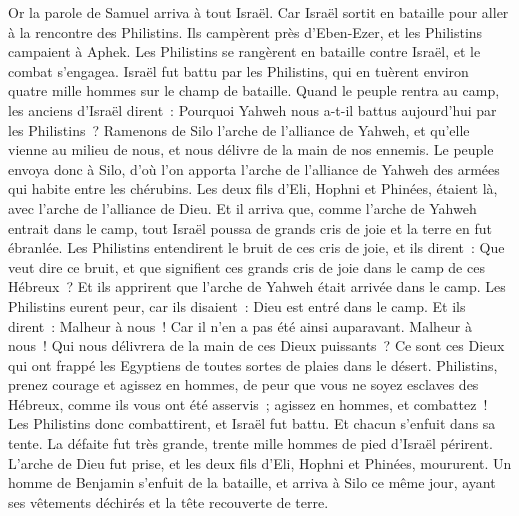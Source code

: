 \begin{multicols}{2}
\VerseOne{}Or la parole de Samuel arriva à tout Israël. Car Israël sortit en bataille pour aller à la rencontre des Philistins. Ils campèrent près d'Eben-Ezer, et les Philistins campaient à Aphek.
Les Philistins se rangèrent en bataille contre Israël, et le combat s'engagea. Israël fut battu par les Philistins, qui en tuèrent environ quatre mille hommes sur le champ de bataille.
Quand le peuple rentra au camp, les anciens d'Israël dirent~: Pourquoi Yahweh nous a-t-il battus aujourd'hui par les Philistins~? Ramenons de Silo l'arche de l'alliance de Yahweh, et qu'elle vienne au milieu de nous, et nous délivre de la main de nos ennemis.
Le peuple envoya donc à Silo, d'où l'on apporta l'arche de l'alliance de Yahweh des armées qui habite entre les chérubins. Les deux fils d'Eli, Hophni et Phinées, étaient là, avec l'arche de l'alliance de Dieu.
Et il arriva que, comme l'arche de Yahweh entrait dans le camp, tout Israël poussa de grands cris de joie et la terre en fut ébranlée.
Les Philistins entendirent le bruit de ces cris de joie, et ils dirent~: Que veut dire ce bruit, et que signifient ces grands cris de joie dans le camp de ces Hébreux~? Et ils apprirent que l'arche de Yahweh était arrivée dans le camp.
Les Philistins eurent peur, car ils disaient~: Dieu est entré dans le camp. Et ils dirent~: Malheur à nous~! Car il n'en a pas été ainsi auparavant.
Malheur à nous~! Qui nous délivrera de la main de ces Dieux puissants~? Ce sont ces Dieux qui ont frappé les Egyptiens de toutes sortes de plaies dans le désert.
Philistins, prenez courage et agissez en hommes, de peur que vous ne soyez esclaves des Hébreux, comme ils vous ont été asservis~; agissez en hommes, et combattez~!
Les Philistins donc combattirent, et Israël fut battu. Et chacun s'enfuit dans sa tente. La défaite fut très grande, trente mille hommes de pied d'Israël périrent.
L'arche de Dieu fut prise, et les deux fils d'Eli, Hophni et Phinées, moururent.
Un homme de Benjamin s'enfuit de la bataille, et arriva à Silo ce même jour, ayant ses vêtements déchirés et la tête recouverte de terre.

\end{multicols}

